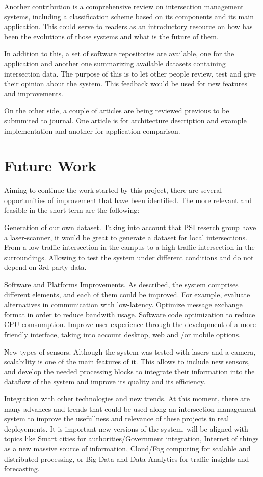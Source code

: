 Another contribution is a comprehensive review on intersection management systems, including a classification scheme based on its components and its main application. This could serve to readers as an introductory resource on how has been the evolutions of those systems and what is the future of them.

In addition to this, a set of software repositories are available, one for the application and another one summarizing available datasets containing intersection data. The purpose of this is to let other people review, test and give their opinion about the system. This feedback would be used for new features and improvements. 

On the other side, a couple of articles are being reviewed previous to be submmited to journal. One article is for architecture description and example implementation and another for application comparison.

\section{Future Work}

Aiming to continue the work started by this project, there are several opportunities of improvement that have been identified. The more relevant and feasible in the short-term are the following:

Generation of our own dataset. Taking into account that PSI reserch group have a laser-scanner, it would be great to generate a dataset for local intersections. From a low-traffic intersection in the campus to a high-traffic intersection in the surroundings. Allowing to test the system under different conditions and do not depend on 3rd party data.

Software and Platforms Improvements. As described, the system comprises different elements, and each of them could be improved. For example, evaluate alternatives in communication with low-latency. Optimize message exchange format in order to reduce bandwith usage. Software code optimization to reduce CPU comsumption. Improve user experience through the development of a more friendly interface, taking into account desktop, web and /or mobile options.

New types of sensors. Although the system was tested with lasers and a camera, scalability is one of the main features of it. This allows to include new sensors, and develop the needed processing blocks to integrate their information into the dataflow of the system and improve its quality and its efficiency.

Integration with other technologies and new trends. At this moment, there are many advances and trends that could be used along an intersection management system to improve the usefullness and relevance of these projects in real deployements. It is important new versions of the system, will be aligned with topics like Smart cities for authorities/Government integration, Internet of things as a new massive source of information, Cloud/Fog computing for scalable and distributed processing, or Big Data and Data Analytics for traffic insights and forecasting.
